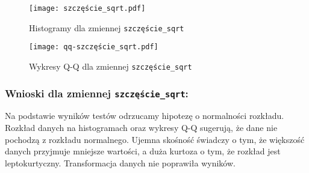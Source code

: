 \documentclass[12pt,a4paper]{article}
\begin{document}
\begin{figure}[H]
    \centering
    \texttt{[image: szczęście\_sqrt.pdf]}
    \caption{Histogramy dla zmiennej \texttt{szczęście\_sqrt}}
\end{figure}
\begin{figure}[H]
    \centering
    \texttt{[image: qq-szczęście\_sqrt.pdf]}
    \caption{Wykresy Q-Q dla zmiennej \texttt{szczęście\_sqrt}}
\end{figure}
\subsubsection*{Wnioski dla zmiennej \texttt{szczęście\_sqrt}:}
Na podstawie wyników testów odrzucamy hipotezę o normalności rozkładu. Rozkład danych na histogramach oraz wykresy Q-Q sugerują, że dane nie pochodzą z rozkładu normalnego. Ujemna skośność świadczy o tym, że większość danych przyjmuje mniejsze wartości, a duża kurtoza o tym, że rozkład jest leptokurtyczny. Transformacja danych nie poprawiła wyników.
\end{document}
